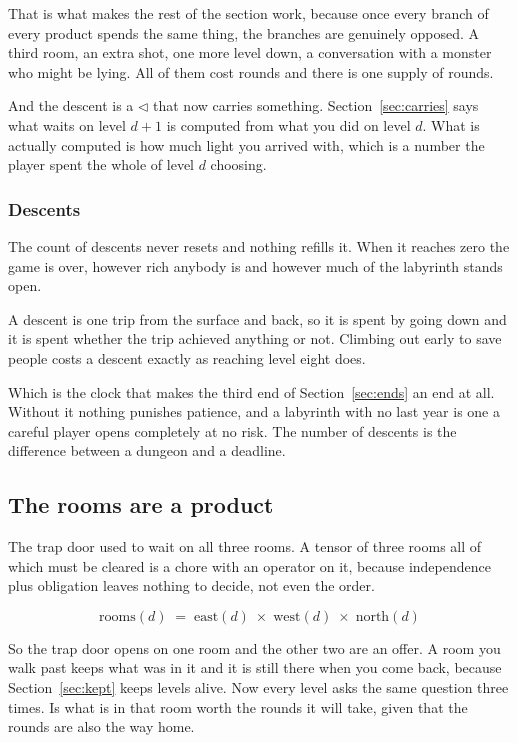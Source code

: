 \documentclass[11pt,a4paper]{article}
\begin{document}
That is what makes the rest of the section work, because once every branch of every product
spends the same thing, the branches are genuinely opposed. A third room, an extra shot, one more
level down, a conversation with a monster who might be lying. All of them cost rounds and there is
one supply of rounds.

And the descent is a $\lhd$ that now carries something. Section~\ref{sec:carries} says what waits
on level $d{+}1$ is computed from what you did on level $d$. What is actually computed is how much
light you arrived with, which is a number the player spent the whole of level $d$ choosing.

\subsubsection*{Descents}

The count of descents never resets and nothing refills it. When it reaches zero the game is over,
however rich anybody is and however much of the labyrinth stands open.

A descent is one trip from the surface and back, so it is spent by going down and it is spent
whether the trip achieved anything or not. Climbing out early to save people costs a descent
exactly as reaching level eight does.

\begin{sectionbox}
Which is the clock that makes the third end of Section~\ref{sec:ends} an end at all. Without it
nothing punishes patience, and a labyrinth with no last year is one a careful player opens
completely at no risk. The number of descents is the difference between a dungeon and a deadline.
\end{sectionbox}

\subsection{The rooms are a product}

The trap door used to wait on all three rooms. A tensor of three rooms all of which must be
cleared is a chore with an operator on it, because independence plus obligation leaves nothing
to decide, not even the order.

\[ \text{rooms}(d) \;=\; \text{east}(d) \;\times\; \text{west}(d) \;\times\; \text{north}(d) \]

So the trap door opens on one room and the other two are an offer. A room you walk past keeps
what was in it and it is still there when you come back, because Section~\ref{sec:kept} keeps
levels alive. Now every level asks the same question three times. Is what is in that room worth
the rounds it will take, given that the rounds are also the way home.
\end{document}
